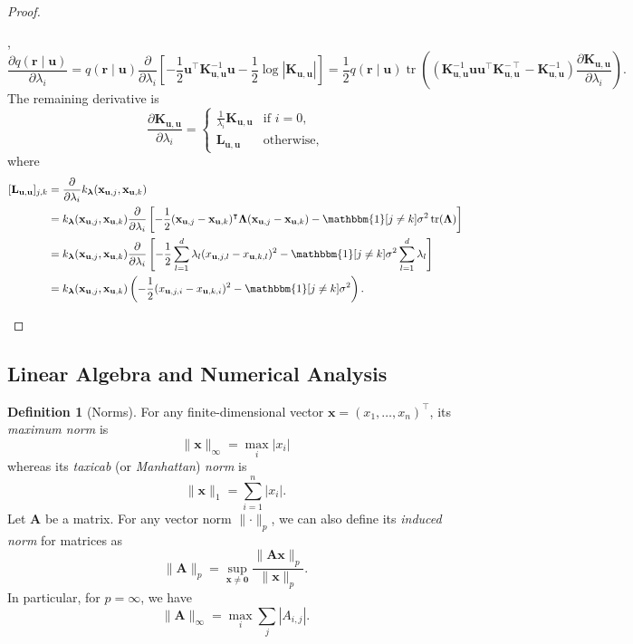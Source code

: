 \documentclass{article}
\theoremstyle{definition}
\newtheorem{definition}[theorem]{Definition}
\theoremstyle{remark}
\DeclareMathOperator{\tr}{tr}
\newcommand{\Kuu}{\mathbf{K}_{\mathbf{u},\mathbf{u}}}
\newcommand{\Luu}{\mathbf{L}_{\mathbf{u},\mathbf{u}}}
\newcommand{\dl}{\frac{\partial}{\partial \lambda_i}}
\begin{document}
\begin{proof}
\begin{enumerate}
    \cite{DBLP:books/lib/RasmussenW06},
    \[
      \frac{\partial q(\mathbf{r} \mid \mathbf{u})}{\partial \lambda_i} =
      q(\mathbf{r} \mid \mathbf{u}) \dl
      \left[-\frac{1}{2}\mathbf{u}^\intercal\Kuu^{-1}\mathbf{u} -
        \frac{1}{2}\log|\Kuu| \right] = \frac{1}{2}q(\mathbf{r} \mid \mathbf{u})\tr
      \left((\Kuu^{-1}\mathbf{u}\mathbf{u}^\intercal\Kuu^{-\intercal} -
        \Kuu^{-1}) \frac{\partial \Kuu}{\partial \lambda_i} \right).
    \]
    The remaining derivative is
    \[
      \frac{\partial \Kuu}{\partial \lambda_i} =
      \begin{cases}
        \frac{1}{\lambda_i}\Kuu & \text{if } i = 0, \\
        \Luu & \text{otherwise,}
      \end{cases}
    \]
    where
    \[
      \begin{split}
        [\Luu]_{j,k} &= \dl k_{\bm\lambda}(\mathbf{x}_{\mathbf{u},j},
        \mathbf{x}_{\mathbf{u},k}) \\
        &= k_{\bm\lambda}(\mathbf{x}_{\mathbf{u},j}, \mathbf{x}_{\mathbf{u},k})
        \dl \left[-\frac{1}{2}(\mathbf{x}_{\mathbf{u},j} -
          \mathbf{x}_{\mathbf{u},k})^\intercal \bm\Lambda
          (\mathbf{x}_{\mathbf{u},j} - \mathbf{x}_{\mathbf{u},k}) -
          \mathbbm{1}[j \ne k]\sigma^2\tr(\bm\Lambda) \right] \\
        &= k_{\bm\lambda}(\mathbf{x}_{\mathbf{u},j}, \mathbf{x}_{\mathbf{u},k})
        \dl \left[-\frac{1}{2}\sum_{l=1}^d \lambda_l
          (x_{\mathbf{u},j,l} - x_{\mathbf{u},k,l})^2 -
          \mathbbm{1}[j \ne k]\sigma^2\sum_{l=1}^d \lambda_l \right] \\
        &= k_{\bm\lambda}(\mathbf{x}_{\mathbf{u},j}, \mathbf{x}_{\mathbf{u},k})
        \left( -\frac{1}{2}(x_{\mathbf{u},j,i} -
        x_{\mathbf{u},k,i})^2 - \mathbbm{1}[j \ne k]\sigma^2 \right).
      \end{split}
    \]
  \end{enumerate}
\end{proof}

\subsection{Linear Algebra and Numerical Analysis}

\begin{definition}[Norms]
  For any finite-dimensional vector $\mathbf{x} = (x_1, \dots, x_n)^\intercal$,
  its \emph{maximum norm} is
  \[
    \lVert \mathbf{x} \rVert_\infty = \max_i |x_i|
  \]
  whereas its \emph{taxicab} (or \emph{Manhattan}) \emph{norm} is
  \[
    \lVert \mathbf{x} \rVert_1 = \sum_{i = 1}^n |x_i|.
  \]
  Let $\mathbf{A}$ be a matrix. For any vector norm $\lVert
  \cdot \rVert_p$, we can also define its \emph{induced norm} for matrices as
  \[
    \lVert \mathbf{A} \rVert_p = \sup_{\mathbf{x} \ne \mathbf{0}} \frac{\lVert
      \mathbf{Ax} \rVert_p}{\lVert \mathbf{x} \rVert_p}.
  \]
  In particular, for $p = \infty$, we have
  \[
    \lVert \mathbf{A} \rVert_\infty = \max_i \sum_{j} |A_{i,j}|.
  \]
\end{definition}
\end{document}
